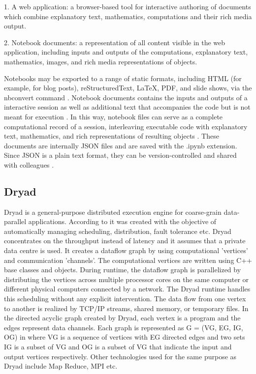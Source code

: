     1. A web application: a browser-based tool for interactive
    authoring of documents which combine explanatory text,
    mathematics, computations and their rich media output.

    2. Notebook documents: a representation of all content visible in
    the web application, including inputs and outputs of the
    computations, explanatory text, mathematics, images, and rich
    media representations of objects.

    Notebooks may be exported to a range of static formats, including
    HTML (for example, for blog posts), reStructuredText, LaTeX, PDF,
    and slide shows, via the nbconvert command \cite{www-jupyter-3}.
    Notebook documents contains the inputs and outputs of a
    interactive session as well as additional text that accompanies
    the code but is not meant for execution \cite{www-jupyter-4}. In
    this way, notebook files can serve as a complete computational
    record of a session, interleaving executable code with explanatory
    text, mathematics, and rich representations of resulting
    objects \cite{www-jupyter-5}. These documents are internally JSON
    files and are saved with the .ipynb extension. Since JSON is a
    plain text format, they can be version-controlled and shared with
    colleagues \cite{www-jupyter-6}.

\subsection{Dryad}

    Dryad is a general-purpose distributed execution engine for
    coarse-grain data-parallel applications. According to
    \cite{www-DryadIntro} it was created with the objective of
    automatically managing scheduling, distribution, fault tolerance
    etc. Dryad concentrates on the throughput instead of latency and
    it assumes that a private data centre is used. It creates a
    dataflow graph by using computational 'vertices' and communication
    'channels'. The computational vertices are written using C++ base
    classes and objects. During runtime, the dataflow graph is
    parallelized by distributing the vertices across multiple
    processor cores on the same computer or different physical
    computers connected by a network. The Dryad runtime handles this
    scheduling without any explicit intervention. The data flow from
    one vertex to another is realized by TCP/IP streams, shared
    memory, or temporary files. In the directed acyclic graph created
    by Dryad, each vertex is a program and the edges represent data
    channels. Each graph is represented as G = (VG, EG, IG, OG) in
    \cite{DryadPaper} where VG is a sequence of vertices with EG
    directed edges and two sets IG is a subset of VG and OG is a
    subset of VG that indicate the input and output vertices
    respectively. Other technologies used for the same purpose as
    Dryad include Map Reduce, MPI etc.
    

